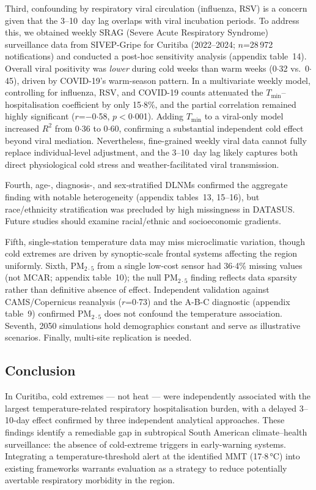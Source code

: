 \documentclass[review,number]{elsarticle}
\begin{document}
Third, confounding by respiratory viral circulation (influenza, RSV)
is a concern given that the 3--10~day lag overlaps with viral
incubation periods. To address this, we obtained weekly SRAG
(Severe Acute Respiratory Syndrome) surveillance data from
SIVEP-Gripe for Curitiba (2022--2024; $n$=28\,972 notifications)
and conducted a post-hoc sensitivity analysis (appendix table~14).
Overall viral positivity was \emph{lower} during cold weeks than
warm weeks (0${\cdot}$32 vs.\ 0${\cdot}$45), driven by COVID-19's
warm-season pattern. In a multivariate weekly model, controlling for
influenza, RSV, and COVID-19 counts attenuated the
$T_\mathrm{min}$--hospitalisation coefficient by only
15${\cdot}$8\%, and the partial correlation remained highly
significant ($r$=$-$0${\cdot}$58, $p$$<$0${\cdot}$001). Adding
$T_\mathrm{min}$ to a viral-only model increased $R^2$ from
0${\cdot}$36 to 0${\cdot}$60, confirming a substantial independent
cold effect beyond viral mediation. Nevertheless, fine-grained
weekly viral data cannot fully replace individual-level adjustment,
and the 3--10~day lag likely captures both direct physiological
cold stress and weather-facilitated viral transmission.

Fourth, age-, diagnosis-, and sex-stratified DLNMs confirmed the
aggregate finding with notable heterogeneity (appendix
tables~13, 15--16), but race/ethnicity stratification was precluded
by high missingness in DATASUS. Future studies should examine
racial/ethnic and socioeconomic gradients.

Fifth, single-station temperature data may miss microclimatic
variation, though cold extremes are driven by synoptic-scale frontal
systems affecting the region uniformly. Sixth, $\text{PM}_{2{\cdot}5}$
from a single low-cost sensor had 36${\cdot}$4\% missing values (not
MCAR; appendix table~10); the null $\text{PM}_{2{\cdot}5}$ finding
reflects data sparsity rather than definitive absence of effect.
Independent validation against CAMS/Copernicus reanalysis
($r$=0${\cdot}$73) and the A-B-C diagnostic (appendix table~9)
confirmed $\text{PM}_{2{\cdot}5}$ does not confound the temperature
association.\cite{daCosta2024}
Seventh, 2050 simulations hold demographics constant and serve as
illustrative scenarios. Finally, multi-site replication is needed.

\subsection{Conclusion}

In Curitiba, cold extremes --- not heat --- were independently
associated with the largest temperature-related respiratory
hospitalisation burden, with a
delayed 3--10-day effect confirmed by three independent analytical
approaches. These findings identify a remediable gap in subtropical
South American climate--health surveillance: the absence of
cold-extreme triggers in early-warning systems. Integrating a
temperature-threshold alert at the identified MMT
(17${\cdot}$8\,°C) into existing frameworks warrants evaluation as a
strategy to reduce potentially avertable respiratory morbidity in
the region.
\end{document}
